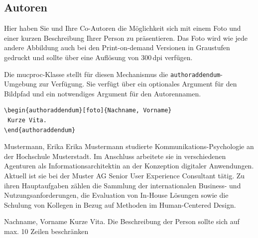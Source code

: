 \documentclass[ngerman]{mucproc}
\newenvironment{minted}[2][]{\endgraf\verbatim}{\endverbatim}
\begin{document}
\nocite{DIN9241}

\printbibliography[prenote=bibnote]%


\subsection{Autoren}
Hier haben Sie und Ihre Co-Autoren die Möglichkeit sich mit einem Foto und einer kurzen Beschreibung Ihrer Person zu präsentieren. Das Foto wird wie jede andere Abbildung auch bei den Print-on-demand Versionen in Graustufen gedruckt und sollte über eine Auflösung von 300\,dpi verfügen.

Die \textsf{mucproc}-Klasse stellt für diesen Mechanismus die \texttt{authoraddendum}-Umgebung zur Verfügung. Sie verfügt über ein optionales Argument für den Bildpfad und ein notwendiges Argument für den Autorennamen.

\begin{verbatim}
\begin{authoraddendum}[foto]{Nachname, Vorname}
 Kurze Vita.
\end{authoraddendum}
\end{verbatim}


\begin{authoraddendum}[foto]{Mustermann, Erika}
	Erika Mustermann studierte Kommunikations-Psychologie an der Hochschule Musterstadt. Im Anschluss arbeitete sie in verschiedenen Agenturen als Informationsarchitektin an der Konzeption digitaler Anwendungen. Aktuell ist sie bei der Muster AG Senior User Experience Consultant tätig. Zu ihren Hauptaufgaben zählen die Sammlung der internationalen Business- und Nutzungsanforderungen, die Evaluation von In-House Lösungen sowie die Schulung von Kollegen in Bezug auf Methoden im Human-Centered Design.
\end{authoraddendum}

\begin{authoraddendum}[foto]{Nachname, Vorname}
Kurze Vita. Die Beschreibung der Person sollte sich auf max. 10 Zeilen beschränken
\end{authoraddendum}
\end{document}
